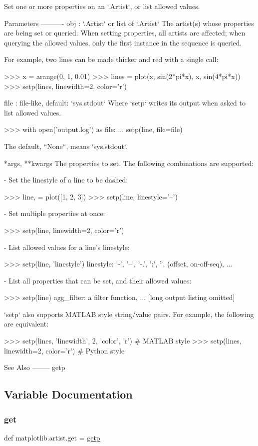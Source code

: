 \begin{DoxyVerb}Set one or more properties on an `.Artist`, or list allowed values.

Parameters
----------
obj : `.Artist` or list of `.Artist`
    The artist(s) whose properties are being set or queried.  When setting
    properties, all artists are affected; when querying the allowed values,
    only the first instance in the sequence is queried.

    For example, two lines can be made thicker and red with a single call:

    >>> x = arange(0, 1, 0.01)
    >>> lines = plot(x, sin(2*pi*x), x, sin(4*pi*x))
    >>> setp(lines, linewidth=2, color='r')

file : file-like, default: `sys.stdout`
    Where `setp` writes its output when asked to list allowed values.

    >>> with open('output.log') as file:
    ...     setp(line, file=file)

    The default, ``None``, means `sys.stdout`.

*args, **kwargs
    The properties to set.  The following combinations are supported:

    - Set the linestyle of a line to be dashed:

      >>> line, = plot([1, 2, 3])
      >>> setp(line, linestyle='--')

    - Set multiple properties at once:

      >>> setp(line, linewidth=2, color='r')

    - List allowed values for a line's linestyle:

      >>> setp(line, 'linestyle')
      linestyle: {'-', '--', '-.', ':', '', (offset, on-off-seq), ...}

    - List all properties that can be set, and their allowed values:

      >>> setp(line)
      agg_filter: a filter function, ...
      [long output listing omitted]

    `setp` also supports MATLAB style string/value pairs.  For example, the
    following are equivalent:

    >>> setp(lines, 'linewidth', 2, 'color', 'r')  # MATLAB style
    >>> setp(lines, linewidth=2, color='r')        # Python style

See Also
--------
getp
\end{DoxyVerb}
 

\subsection{Variable Documentation}
\mbox{\label{namespacematplotlib_1_1artist_ae96fe45bfe7ec8859299a9de210c0dca}} 
\subsubsection{\texorpdfstring{get}{get}}
{\footnotesize\ttfamily def matplotlib.\+artist.\+get = \hyperlink{namespacematplotlib_1_1artist_a785d2dbc5e400ed2895a0402aa5a033b}{getp}}

